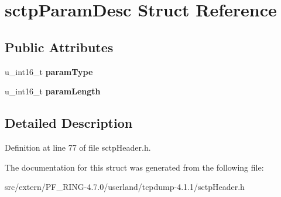 \hypertarget{structsctp_param_desc}{
\section{sctpParamDesc Struct Reference}
\label{structsctp_param_desc}
}
\subsection*{Public Attributes}
\begin{DoxyCompactItemize}
\item 
\hypertarget{structsctp_param_desc_aca33bbbe7d74321e51c61fed9e85b497}{
u\_\-int16\_\-t {\bfseries paramType}}
\label{structsctp_param_desc_aca33bbbe7d74321e51c61fed9e85b497}

\item 
\hypertarget{structsctp_param_desc_a0e39b73ed7b5eb9271c4ab05052be29c}{
u\_\-int16\_\-t {\bfseries paramLength}}
\label{structsctp_param_desc_a0e39b73ed7b5eb9271c4ab05052be29c}

\end{DoxyCompactItemize}


\subsection{Detailed Description}


Definition at line 77 of file sctpHeader.h.



The documentation for this struct was generated from the following file:\begin{DoxyCompactItemize}
\item 
src/extern/PF\_\-RING-\/4.7.0/userland/tcpdump-\/4.1.1/sctpHeader.h\end{DoxyCompactItemize}
